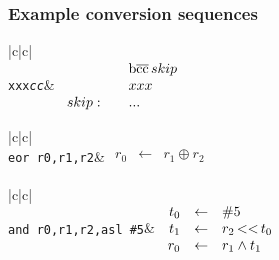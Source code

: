 \subsubsection{Example conversion sequences}


\vspace{0.3cm}

{\centering \begin{tabular}{|c|c|}
\hline
{}\\
\hline
\hline
{\tt xxx{\it cc}}&
\( \begin{array}{rcl}
 & & \mathop{\rm b\overline{cc}} skip\\
 & & xxx\\
skip: & & ... \\
\end{array}\)\\
\hline
\end{tabular}\par}

\vspace{0.3cm}

{\centering \begin{tabular}{|c|c|}
\hline 
{}\\
\hline 
\hline 
{\tt eor r0,r1,r2}&
\( \begin{array}{rcl}
r_0 & \leftarrow & r_1 \oplus r_2\\
\end{array} \)\\
\hline 
\end{tabular}\par}

\vspace{0.3cm}

{\centering \begin{tabular}{|c|c|}
\hline 
{}\\
\hline 
\hline 
{\tt and r0,r1,r2,asl \#5}&
\( \begin{array}{rcl}
t_0 & \leftarrow  & \#5\\
t_1 & \leftarrow  & r_2 \mathop{\rm <<} t_0\\
r_0 & \leftarrow  & r_1 \wedge t_1\\
\end{array} \)\\
\hline 
\end{tabular}\par}

